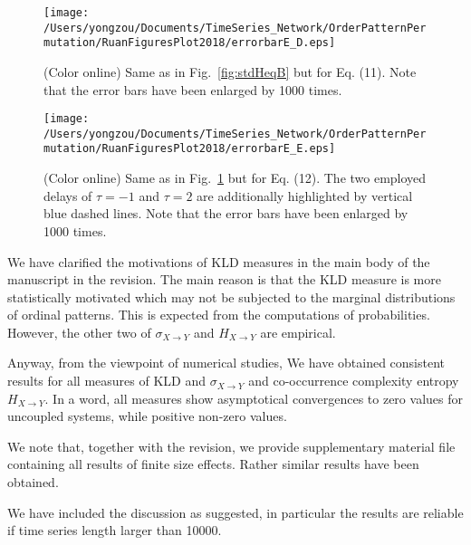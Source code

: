 \documentclass[aps,chaos,superscriptaddress,showkeys]{revtex4}
\begin{document}
\begin{figure}
	\centering
	\texttt{[image: /Users/yongzou/Documents/TimeSeries\_Network/OrderPatternPermutation/RuanFiguresPlot2018/errorbarE\_D.eps]}
\caption{(Color online) Same as in Fig.~\ref{fig:stdHeqB} but for Eq. (11).  {\color{red}Note that the error bars have been enlarged by 1000 times.} \label{fig:stdHeqD}}
\end{figure}

\begin{figure}
	\centering
	\texttt{[image: /Users/yongzou/Documents/TimeSeries\_Network/OrderPatternPermutation/RuanFiguresPlot2018/errorbarE\_E.eps]}
\caption{(Color online) Same as in Fig.~\ref{fig:stdHeqD} but for Eq. (12). The two employed delays of $\tau = -1$ and $\tau = 2$ are additionally highlighted by vertical blue dashed lines. {\color{red}Note that the error bars have been enlarged by 1000 times.}\label{fig:stdHeqE}}
\end{figure}




\begin{center}
\begin{minipage}[c]{0.9\textwidth}
We have clarified the motivations of KLD measures in the main body of the manuscript in the revision. The main reason is that the KLD measure is more statistically motivated which may not be subjected to the marginal distributions of ordinal patterns. This is expected from the computations of probabilities. However, the other two of $\sigma_{X\to Y}$ and $H_{X\to Y}$ are empirical. 

Anyway, from the viewpoint of numerical studies, We have obtained consistent results for all measures of KLD and $\sigma_{X\to Y}$ and co-occurrence complexity entropy $H_{X\to Y}$. In a word, all measures show asymptotical convergences to zero values for uncoupled systems, while positive non-zero values. 

We note that, together with the revision, we provide supplementary material file containing all results of finite size effects. Rather similar results have been obtained. 

We have included the discussion as suggested, in particular the results are reliable if time series length larger than 10000. 
\end{minipage}
\end{center}
\end{document}
